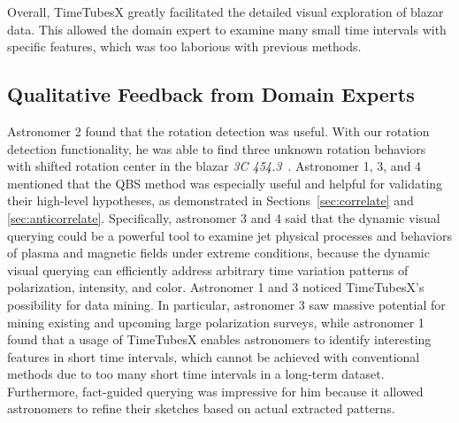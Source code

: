 Overall, TimeTubesX greatly facilitated the detailed visual exploration of blazar data. This allowed the domain expert to examine many small time intervals with specific features, which was too laborious with previous methods.


\subsection{Qualitative Feedback from Domain Experts}\label{sec:feedback}
Astronomer 2 found that the rotation detection was useful. 
With our rotation detection functionality, 
he was able to find three unknown rotation behaviors with shifted rotation center in the blazar \emph{3C 454.3}~\cite{Huang2019}. 
Astronomer 1, 3, and 4 mentioned that the QBS method was especially useful and helpful for validating their high-level hypotheses, as demonstrated in Sections~\ref{sec:correlate} and \ref{sec:anticorrelate}. Specifically, astronomer 3 and 4 said that the dynamic visual querying could be a powerful tool to examine jet physical processes and behaviors of plasma and magnetic fields under extreme conditions, because the dynamic visual querying can efficiently address arbitrary time variation patterns of polarization, intensity, and color. Astronomer 1 and 3 noticed TimeTubesX’s possibility for data mining. In particular, astronomer 3 saw massive potential for mining existing and upcoming large polarization surveys, while astronomer 1 found that a usage of TimeTubesX enables astronomers to identify interesting features in short time intervals, which cannot be achieved with conventional methods due to too many short time intervals in a long-term dataset. Furthermore, fact-guided querying was impressive for him because it allowed astronomers to refine their sketches based on actual extracted patterns.

